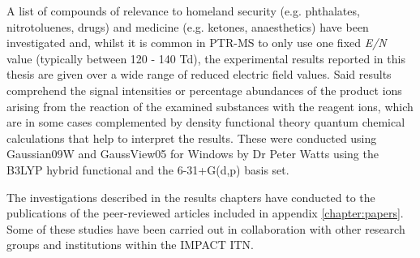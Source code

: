 A list of compounds of relevance to homeland security (e.g. phthalates, nitrotoluenes, drugs) and medicine (e.g. ketones, anaesthetics) have been investigated and, 
whilst it is common in PTR-MS to only use one fixed \textit{E/N} value (typically between 120 - 140 Td), the experimental results reported in this thesis are given over a wide range of reduced electric field values.
%
Said results comprehend the signal intensities or percentage abundances of the product ions arising from the reaction of the examined substances with the reagent ions, which are in some cases complemented by density functional theory quantum chemical calculations that help to interpret the results. These were conducted using Gaussian09W and GaussView05 for Windows by Dr Peter Watts using the B3LYP hybrid functional and the 6-31+G(d,p) basis set.



The investigations described in the results chapters have conducted to the publications of the peer-reviewed articles included in appendix \ref{chapter:papers}.
%
Some of these studies have been carried out in collaboration with other research groups and institutions within the IMPACT ITN.

%













